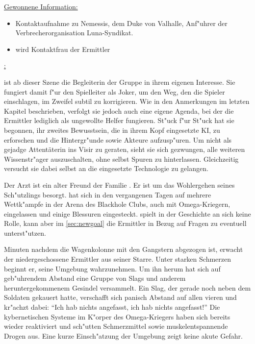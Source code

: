 \begin{remarks}
	\underline{Gewonnene Information:}
	
	\begin{itemize}
		\item Kontaktaufnahme zu Nemessis, dem Duke von Valhalle, Anf"uhrer der Verbrecherorganisation Luna-Syndikat.
		\item \xl{} wird Kontaktfrau der Ermittler
	\end{itemize}

	\underline{\xl{}:}

	\xl{} ist ab dieser Szene die Begleiterin der Gruppe in ihrem eigenen Interesse. Sie fungiert damit f"ur den Spielleiter als Joker, um den Weg, den die Spieler einschlagen, im Zweifel subtil zu korrigieren. Wie in den Anmerkungen im letzten Kapitel beschrieben, verfolgt sie jedoch auch eine eigene Agenda, bei der die Ermittler lediglich als ungewollte Helfer fungieren. St"uck f"ur St"uck hat sie begonnen, ihr zweites Bewusstsein, die in ihrem Kopf eingesetzte KI, zu erforschen und die Hintergr"unde sowie Akteure aufzusp"uren.  Um nicht als gejadge Attentäterin ins Visir zu geraten, sieht sie sich gezwungen, alle weiteren Wissenstr"ager auszuschalten, ohne selbst Spuren zu hinterlassen. Gleichzeitig versucht sie dabei selbst an die eingesetzte Technologie zu gelangen.

	\underline{ }

	Der Arzt   ist ein alter Freund der Familie . Er ist um das Wohlergehen seines Sch"utzlings \xl{} besorgt. \xl{} hat sich in den vergangenen Tagen auf mehrere Wettk"ampfe in der Arena des Blackhole Clubs, auch mit Omega-Kriegern, eingelassen und einige Blessuren eingesteckt.   spielt in der Geschichte an sich keine Rolle, kann aber im \cref{sec:newgoal} die Ermittler in Bezug auf Fragen zu \xl{} eventuell unterst"utzen.
\end{remarks}



Minuten nachdem die Wagenkolonne mit den Gangstern abgezogen ist, erwacht der niedergeschossene Ermittler aus seiner Starre. Unter starken Schmerzen beginnt er, seine Umgebung wahrzunehmen. Um ihn herum hat sich auf geb"uhrendem Abstand eine Gruppe von Slags und anderem heruntergekommenem Gesindel versammelt. Ein Slag, der gerade noch neben dem Soldaten gekauert hatte, verschafft sich panisch Abstand auf allen vieren und kr"achzt dabei: "`Ich hab nichts angefasst, ich hab nichts angefasst!"' Die kybernetischen Systeme im K"orper des 
Omega-Kriegers haben sich bereits wieder reaktiviert und sch"utten Schmerzmittel sowie muskelentspannende Drogen aus. Eine kurze Einsch"atzung der Umgebung zeigt keine akute Gefahr.

